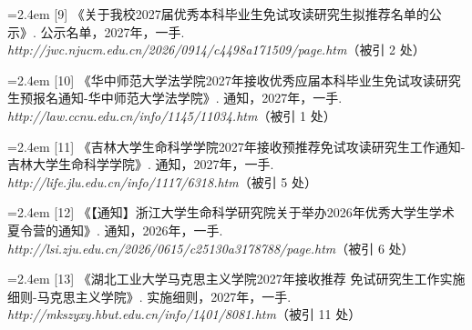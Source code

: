 {\nopagebreak\vspace{1pt}
\noindent\hangindent=2.4em \label{src:S0010}{\color{cAccent}[9]} 《关于我校2027届优秀本科毕业生免试攻读研究生拟推荐名单的公示》. 公示名单，2027年，一手. \textit{http://jwc.njucm.edu.cn/2026/0914/c4498a171509/page.htm}（被引 2 处）\par
\vspace{0.6pt}
\vspace{3.5pt}\par
\nopagebreak\vspace{1pt}
\noindent\hangindent=2.4em \label{src:S0011}{\color{cAccent}[10]} 《华中师范大学法学院2027年接收优秀应届本科毕业生免试攻读研究生预报名通知-华中师范大学法学院》. 通知，2027年，一手. \textit{http://law.ccnu.edu.cn/info/1145/11034.htm}（被引 1 处）\par
\vspace{0.6pt}
\vspace{3.5pt}\par
\nopagebreak\vspace{1pt}
\noindent\hangindent=2.4em \label{src:S0012}{\color{cAccent}[11]} 《吉林大学生命科学学院2027年接收预推荐免试攻读研究生工作通知-吉林大学生命科学学院》. 通知，2027年，一手. \textit{http://life.jlu.edu.cn/info/1117/6318.htm}（被引 5 处）\par
\vspace{0.6pt}
\vspace{3.5pt}\par
\nopagebreak\vspace{1pt}
\noindent\hangindent=2.4em \label{src:S0013}{\color{cAccent}[12]} 《【通知】浙江大学生命科学研究院关于举办2026年优秀大学生学术夏令营的通知》. 通知，2026年，一手. \textit{http://lsi.zju.edu.cn/2026/0615/c25130a3178788/page.htm}（被引 6 处）\par
\vspace{0.6pt}
\vspace{3.5pt}\par
\nopagebreak\vspace{1pt}
\noindent\hangindent=2.4em \label{src:S0014}{\color{cAccent}[13]} 《湖北工业大学马克思主义学院2027年接收推荐 免试研究生工作实施细则-马克思主义学院》. 实施细则，2027年，一手. \textit{http://mkszyxy.hbut.edu.cn/info/1401/8081.htm}（被引 11 处）\par
}
